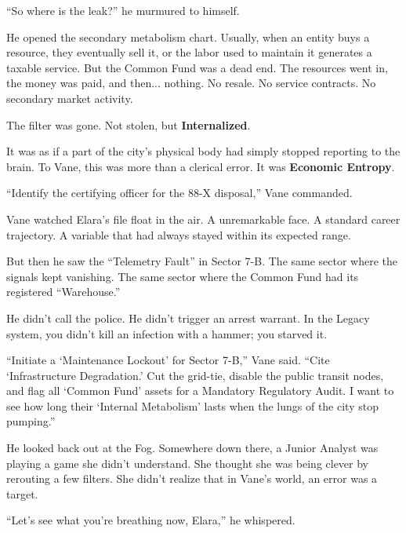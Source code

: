``So where is the leak?'' he murmured to himself.

He opened the secondary metabolism chart. Usually, when an entity buys a resource, they eventually sell it, or the labor used to maintain it generates a taxable service. But the Common Fund was a dead end. The resources went in, the money was paid, and then... nothing. No resale. No service contracts. No secondary market activity. 

The filter was gone. Not stolen, but \textbf{Internalized}. 

It was as if a part of the city’s physical body had simply stopped reporting to the brain. To Vane, this was more than a clerical error. It was \textbf{Economic Entropy}. 

``Identify the certifying officer for the 88-X disposal,'' Vane commanded.


Vane watched Elara’s file float in the air. A unremarkable face. A standard career trajectory. A variable that had always stayed within its expected range. 

But then he saw the ``Telemetry Fault'' in Sector 7-B. The same sector where the signals kept vanishing. The same sector where the Common Fund had its registered ``Warehouse.''

He didn't call the police. He didn't trigger an arrest warrant. In the Legacy system, you didn't kill an infection with a hammer; you starved it.

``Initiate a `Maintenance Lockout' for Sector 7-B,'' Vane said. ``Cite `Infrastructure Degradation.' Cut the grid-tie, disable the public transit nodes, and flag all `Common Fund' assets for a Mandatory Regulatory Audit. I want to see how long their `Internal Metabolism' lasts when the lungs of the city stop pumping.''

He looked back out at the Fog. Somewhere down there, a Junior Analyst was playing a game she didn't understand. She thought she was being clever by rerouting a few filters. She didn't realize that in Vane’s world, an error was a target.

``Let's see what you’re breathing now, Elara,'' he whispered.
